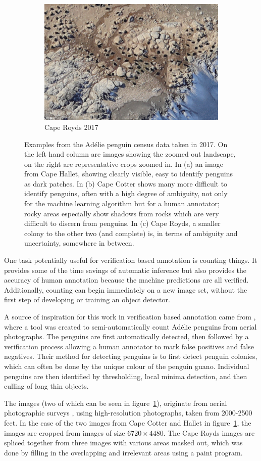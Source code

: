 \begin{figure}[pht!]
\begin{subfigure}[t]{1.0\linewidth}
  \hfill
  \includegraphics[width=0.475\linewidth]{figures/annotation/penguin/royds.jpg}
  \caption{Cape Royds 2017}
\end{subfigure}

\caption{Examples from the Ad\'elie penguin census data taken in 2017. On the left hand column are images showing the zoomed out landscape, on the right are representative crops zoomed in.  In (a) an image from Cape Hallet, showing clearly visible, easy to identify penguins as dark patches. In (b) Cape Cotter shows many more difficult to identify penguins, often with a high degree of ambiguity, not only for the machine learning algorithm but for a human annotator; rocky areas especially show shadows from rocks which are very difficult to discern from penguins. In (c) Cape Royds, a smaller colony to the other two (and complete) is, in terms of ambiguity and uncertainty, somewhere in between. }
\label {fig:penguin_examples}
\end{figure}


One task potentially useful for verification based annotation is counting things. It provides some of the time savings of automatic inference but also provides the accuracy of human annotation because the machine predictions are all verified. Additionally, counting can begin immediately on a new image set, without the first step of developing or training an object detector.

A source of inspiration for this work in verification based annotation came from \cite{McNeill2011}, where a tool was created to semi-automatically count Ad\'elie penguins from aerial photographs. The penguins are first automatically detected, then followed by a verification process allowing a human annotator to mark false positives and false negatives. Their method for detecting penguins is to first detect penguin colonies, which can often be done by the unique colour of the penguin guano. Individual penguins are then identified by thresholding, local minima detection, and then culling of long thin objects. 

The images (two of which can be seen in figure~\ref{fig:penguin_examples}), originate from aerial photographic surveys \cite{Lyver2014}, using high-resolution photographs, taken from 2000-2500 feet. In the case of the two images from Cape Cotter and Hallet in figure~\ref{fig:penguin_examples}, the images are cropped from images of size $ 6720\times4480 $. The Cape Royds images are spliced together from three images with various areas masked out, which was done by filling in the overlapping and irrelevant areas using a paint program.

